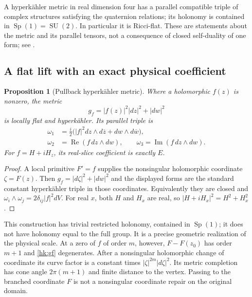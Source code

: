 \documentclass[11pt]{article}
\numberwithin{equation}{section}
\newtheorem{proposition}[theorem]{Proposition}
\theoremstyle{definition}
\theoremstyle{remark}
\begin{document}
A hyperk\"ahler metric in real dimension four has a parallel compatible
triple of complex structures satisfying the quaternion relations; its
holonomy is contained in $\operatorname{Sp}(1)=\operatorname{SU}(2)$.
In particular it is Ricci-flat.  These are statements about the metric
and its parallel tensors, not a consequence of closed self-duality of
one form; see \cite{Joyce2001}.

\subsection{A flat lift with an exact physical coefficient}
\begin{proposition}[Pullback hyperk\"ahler metric]\label{hk:flat}
Where a holomorphic $f(z)$ is nonzero, the metric
\begin{equation}\label{hk:gf}
 g_f=|f(z)|^2|dz|^2+|dw|^2
\end{equation}
is locally flat and hyperk\"ahler.  Its parallel triple is
\begin{align*}
 \omega_1&=\frac i2\bigl(|f|^2dz\wedge d\overline z+
                                      dw\wedge d\overline w\bigr),\\
 \omega_2&=\operatorname{Re}(f\,dz\wedge dw),\qquad
 \omega_3=\operatorname{Im}(f\,dz\wedge dw).
\end{align*}
For $f=H+iH_z$, its real-slice coefficient is exactly $E$.
\end{proposition}
\begin{proof}
A local primitive $F'=f$ supplies the nonsingular holomorphic coordinate
$\zeta=F(z)$.  Then $g_f=|d\zeta|^2+|dw|^2$ and the displayed forms
are the standard constant hyperk\"ahler triple in those coordinates.
Equivalently they are closed and
$\omega_i\wedge\omega_j=2\delta_{ij}|f|^2dV$.
For real $x$, both $H$ and $H_x$ are real, so
$|H+iH_x|^2=H^2+H_x^2$.
\end{proof}

This construction has trivial restricted holonomy, contained in
$\operatorname{Sp}(1)$; it does not have holonomy equal to the full
group.  It is a precise geometric realization of the physical scale.
At a zero of $f$ of order $m$, however, $F-F(z_0)$ has order $m+1$ and
\eqref{hk:gf} degenerates.  After a nonsingular holomorphic change of
coordinate its curve factor is a constant times
$|\zeta|^{2m}|d\zeta|^2$.  Its metric completion has cone angle
$2\pi(m+1)$ and finite distance to the vertex.  Passing to the branched
coordinate $F$ is not a nonsingular coordinate repair on the original
domain.
\end{document}
